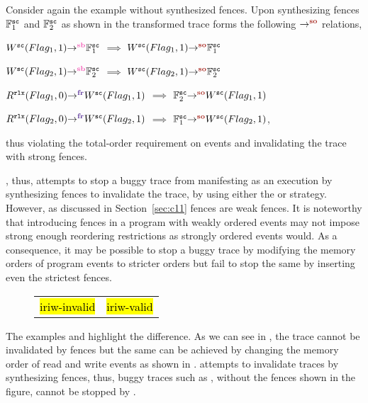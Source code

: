 Consider again the example  without synthesized fences.
Upon synthesizing \sc fences $\mathbb{F}^\sc_1$ and 
$\mathbb{F}^\sc_2$ as shown in  the
transformed trace forms the following $\so{}{}{}$ relations,

$\seqb{}{W^\sc(Flag_1,1)}{\mathbb{F}^\sc_1}$ $\implies$ $\so{}{W^\sc(Flag_1,1)}{\mathbb{F}^\sc_1}$

$\seqb{}{W^\sc(Flag_2,1)}{\mathbb{F}^\sc_2}$ $\implies$ $\so{}{W^\sc(Flag_2,1)}{\mathbb{F}^\sc_2}$

$\fr{}{R^\rlx(Flag_1,0)}{W^\sc(Flag_1,1)}$ $\implies$ $\so{}{\mathbb{F}^\sc_2}{W^\sc(Flag_1,1)}$

$\fr{}{R^\rlx(Flag_2,0)}{W^\sc(Flag_2,1)}$ $\implies$ $\so{}{\mathbb{F}^\sc_1}{W^\sc(Flag_2,1)}$,

thus violating the total-order requirement on \sc events and
invalidating the trace with strong fences.

\ourtechnique, thus, attempts to stop a buggy trace from
manifesting as an execution by synthesizing fences to 
invalidate the trace, by using either the \wkfence or 
\stfence strategy.
%
However, 
as discussed in Section~\ref{sec:c11} \cc fences are weak
fences.
%
It is noteworthy that introducing \cc fences in a program 
with weakly ordered events may not impose strong enough
reordering restrictions as strongly ordered events would.
%
As a consequence, it may be possible to stop a buggy 
trace by modifying the memory orders of program events
to stricter orders but fail to stop the same by 
inserting even the strictest \cc fences.

\begin{figure}[h]
	\begin{tabular}{|c|c|}
		\hline
		\resizebox{0.49\textwidth}{!}{} &
		\resizebox{0.49\textwidth}{!}{} \\
		\hline
		\multicolumn{1}{c}{\hl{iriw-invalid}} & 
		\multicolumn{1}{c}{\hl{iriw-valid}}
	\end{tabular}
\end{figure}
The examples  and  
highlight the difference. As we can see in ,
the trace cannot be invalidated by \cc fences but the same 
can be achieved by changing the memory order of read and 
write events as shown in .
%
%
\ourtechnique attempts to invalidate traces by synthesizing 
\cc fences, thus, buggy
traces such as , without the fences shown 
in the figure, cannot be stopped by \ourtechnique.